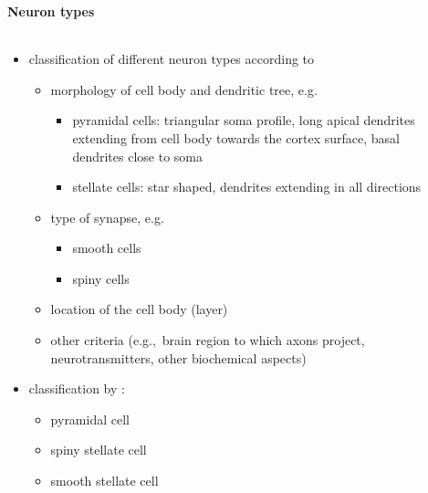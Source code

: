 \documentclass[8pt,t,usepdftitle=false]{beamer}
\begin{document}
\begin{frame}[plain]
  \frametitle{\ttl}
  \framesubtitle{Neuron types}
  \begin{columns}
    \begin{column}{0.5\linewidth}
      \vspace*{-3ex}
       \begin{itemize} 
       \item<1-> classification of different neuron types according to 
         \begin{itemize}
         \item morphology of cell body and dendritic tree, e.g.
           \begin{itemize}
           \item pyramidal cells: triangular soma profile, 
             long apical dendrites extending from cell body towards 
             the cortex surface, basal dendrites close to soma
           \item stellate cells: star shaped, dendrites extending in all directions
           \end{itemize}
         \item<2-> type of synapse, e.g.
           \begin{itemize}
           \item smooth cells
           \item  spiny cells
           \end{itemize}
         \item<3-> location of the cell body (layer)
         \item<4-> other criteria 
           (e.g.,~brain region to which axons project, neurotransmitters, 
           other biochemical aspects)
         \end{itemize}
       \item<5-> classification by \textcite{Abeles91}:
         \begin{itemize}
         \item \alert{pyramidal cell}
         \item \alert{spiny stellate cell}
         \item \alert{smooth stellate cell}
         \end{itemize}
       \end{itemize}
     \end{column}
    \begin{column}{0.5\linewidth}
      \begin{center}

\end{center}
\end{column}
\end{columns}
\end{frame}
\end{document}
